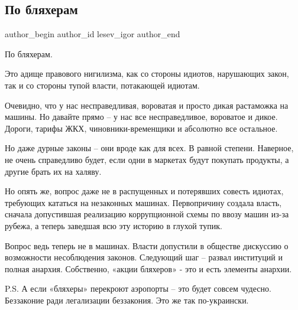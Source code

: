  
 
 
 
 
 
\subsection{По бляхерам}
\label{sec:11_07_2018.fb.lesev_igor.1.po_bljaheram}
 
\ifcmt
 author_begin
   author_id lesev_igor
 author_end
\fi

По бляхерам.

Это адище правового нигилизма, как со стороны идиотов, нарушающих закон, так и
со стороны тупой власти, потакающей идиотам.

Очевидно, что у нас несправедливая, вороватая и просто дикая растаможка на
машины. Но давайте прямо – у нас все несправедливое, вороватое и дикое. Дороги,
тарифы ЖКХ, чиновники-временщики и абсолютно все остальное.

Но даже дурные законы – они вроде как для всех. В равной степени. Наверное, не
очень справедливо будет, если одни в маркетах будут покупать продукты, а другие
брать их на халяву.

Но опять же, вопрос даже не в распущенных и потерявших совесть идиотах,
требующих кататься на незаконных машинах. Первопричину создала власть, сначала
допустившая реализацию коррупционной схемы по ввозу машин из-за рубежа, а
теперь заведшая всю эту историю в глухой тупик.

Вопрос ведь теперь не в машинах. Власти допустили в обществе дискуссию о
возможности несоблюдения законов. Следующий шаг – развал институций и полная
анархия. Собственно, «акции бляхеров» - это и есть элементы анархии.

P.S. А если «бляхеры» перекроют аэропорты – это будет совсем чудесно.
Беззаконие ради легализации беззакония. Это же так по-украински.

